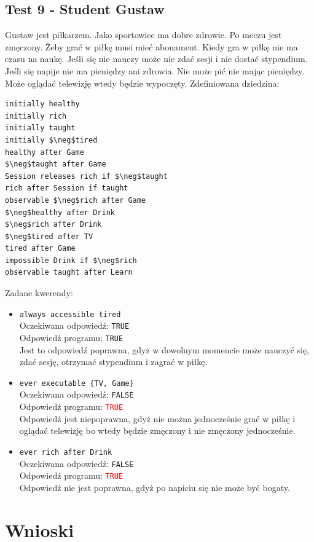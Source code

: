 \documentclass{article}
\begin{document}
\subsection{Test 9 - Student Gustaw}
Gustaw jest piłkarzem. Jako sportowiec ma dobre zdrowie. Po meczu jest zmęczony. Żeby grać w piłkę musi mieć abonament. Kiedy gra w piłkę nie ma czasu na naukę. Jeśli się nie nauczy może nie zdać sesji i nie dostać stypendium. Jeśli się napije nie ma pieniędzy ani zdrowia. Nie może pić nie mając pieniędzy. Może oglądać telewizję wtedy będzie wypoczęty.
Zdefiniowana dziedzina:
\begin{lstlisting}[mathescape=true]
initially healthy
initially rich
initially taught
initially $\neg$tired
healthy after Game
$\neg$taught after Game
Session releases rich if $\neg$taught
rich after Session if taught
observable $\neg$rich after Game
$\neg$healthy after Drink
$\neg$rich after Drink
$\neg$tired after TV
tired after Game
impossible Drink if $\neg$rich
observable taught after Learn
\end{lstlisting}
Zadane kwerendy:
\begin{itemize}
    \item {\large\texttt{always accessible tired}}\\
	Oczekiwana odpowiedź: \texttt{TRUE}\\
    Odpowiedź programu: \texttt{TRUE}\\
    Jest to odpowiedź poprawna, gdyż w dowolnym momencie może nauczyć się, zdać sesję, otrzymać stypendium i zagrać w piłkę.
	
    \item {\large\texttt{ever executable \{TV, Game\}}}\\
	Oczekiwana odpowiedź: \texttt{FALSE}\\
    Odpowiedź programu: \textcolor{red}{\texttt{TRUE}}\\
    Odpowiedź jest niepoprawna, gdyż nie można jednocześnie grać w piłkę i oglądać telewizję bo wtedy będzie zmęczony i nie zmęczony jednocześnie.

	\item {\large\texttt{ever rich after Drink}}\\
	Oczekiwana odpowiedź: \texttt{FALSE}\\
	Odpowiedź programu: \textcolor{red}{\texttt{TRUE}}\\
    Odpowiedź nie jest poprawna, gdyż po napiciu się nie może być bogaty.

\end{itemize}
\newpage
\section{Wnioski}
\end{document}
